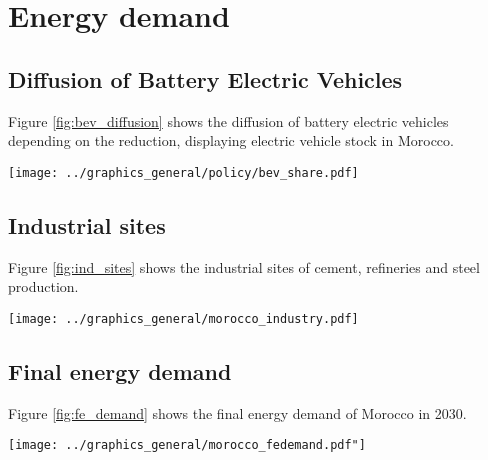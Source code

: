

\section{Energy demand}

\subsection{Diffusion of Battery Electric Vehicles}
\label{subsec:bev_diffusion}
Figure \ref{fig:bev_diffusion} shows the diffusion of battery electric vehicles depending on the \co reduction, displaying electric vehicle stock in Morocco.

\begin{figure*}[h]
    \centering
    \texttt{[image: ../graphics\_general/policy/bev\_share.pdf]}
    \caption{Market diffusion of Battery Electricity Vehicles in Morocco, synthesized based on an s-curve with a growth rate $k=0.2$ and inflection point $x_0=2040$.}
    \label{fig:bev_diffusion}
\end{figure*}

\subsection{Industrial sites}

Figure \ref{fig:ind_sites} shows the industrial sites of cement, refineries and steel production.

\begin{figure*}[h]
    \centering
    \texttt{[image: ../graphics\_general/morocco\_industry.pdf]}
    \caption{Industrial sites in Morocco.}
    \label{fig:ind_sites}
\end{figure*}

\clearpage

\subsection{Final energy demand}

Figure \ref{fig:fe_demand} shows the final energy demand of Morocco in 2030.

\begin{figure*}[h]
    \centering
    \texttt{[image: ../graphics\_general/morocco\_fedemand.pdf"]}
    \caption{Final energy demand of Morocco in 2030}
    \label{fig:fe_demand}
\end{figure*}

\clearpage